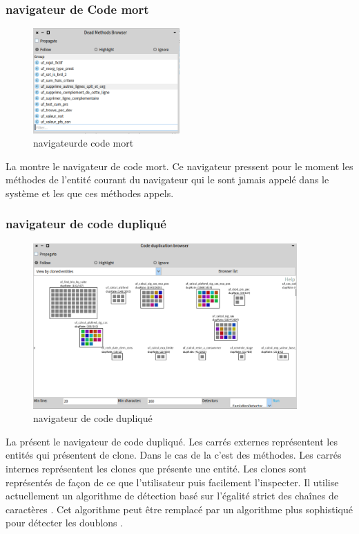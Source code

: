 \documentclass[a4paper]{article}
\begin{document}
\subsubsection{navigateur de Code mort}
\begin{figure}[htbp]
  \begin{center}
  \includegraphics[width=0.5\textwidth]{./figures/deadMethodBrowser.png}
  \caption{navigateurde code mort}
  \label{fig:deadMethodBrowser}
\end{center}
\vspace{-0.3cm}
\end{figure}
La  montre le navigateur de code mort.
Ce navigateur pressent pour le moment les méthodes de l'entité courant du navigateur qui le sont jamais appelé dans le système et les que ces méthodes appels.

\subsubsection{navigateur de code dupliqué}
\begin{figure}[htbp]
  \begin{center}
  \includegraphics[width=0.9\textwidth]{./figures/duplicationBrowser.png}
  \caption{navigateur de code dupliqué}
  \label{fig:duplicationBrowser}
\end{center}
\vspace{-0.3cm}
\end{figure}
La  présent le navigateur de code dupliqué. Les carrés externes représentent les entités qui présentent de clone.
Dans le cas de la  c'est des méthodes. 
Les carrés internes représentent les clones que présente une entité.
Les clones sont représentés de façon de ce que l'utilisateur puis facilement l'inspecter.
Il utilise actuellement un algorithme de détection basé sur l'égalité strict des chaînes de caractères \citep{Duca99b}. 
Cet algorithme peut être remplacé par un algorithme plus sophistiqué pour détecter les doublons \citep{Roy07a}. 
\end{document}
